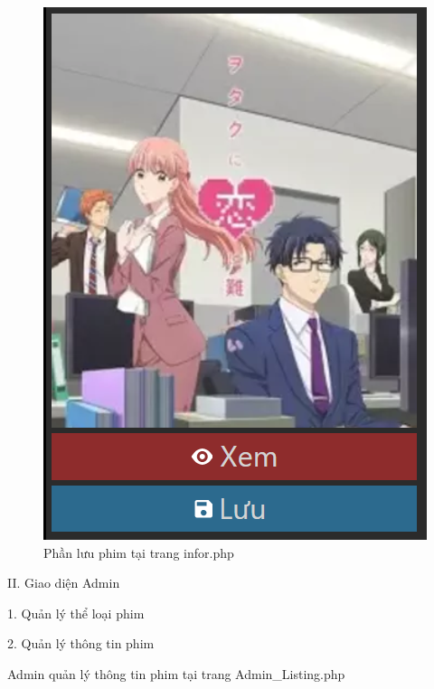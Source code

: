 \documentclass{report}
\begin{document}
\begin{center}
    \begin{figure}[htp]
    \begin{center}
     \includegraphics[scale=0.8]{7.png}
    \end{center}
    \caption{Phần lưu phim tại trang infor.php}
    \label{refhinh1}
    \end{figure}
\end{center}

\changefontsizes{14pt}
\setlength{\parindent}{0cm}
II. Giao diện Admin

1. Quản lý thể loại phim

\newpage
\bigskip
\changefontsizes{14pt}
\setlength{\parindent}{0cm}
2. Quản lý thông tin phim

\changefontsizes{13pt}
\setlength{\parindent}{1cm}
Admin quản lý thông tin phim tại trang Admin\_Listing.php
\end{document}
